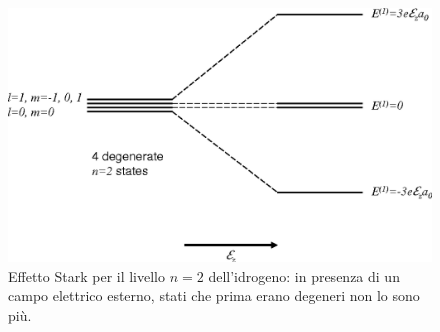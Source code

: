 \documentclass[../../FisicaTeorica.tex]{subfiles}
\begin{document}
\begin{figure}[H]
\centering
\includegraphics[scale=0.3]{Immagini/14_12/image001.png}
\caption{Effetto Stark per il livello $n=2$ dell'idrogeno: in presenza di un campo elettrico esterno, stati che prima erano degeneri non lo sono più.\label{fig:stark_n2}}
\end{figure}
\end{document}
